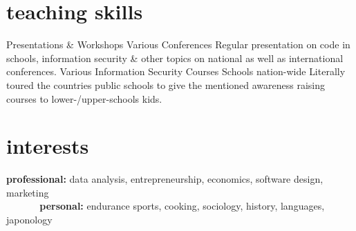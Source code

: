 \documentclass[a4paper]{friggeri-cv} %
\begin{document}

\section{teaching skills}

\begin{entrylist}
{Presentations \& Workshops}
{Various Conferences}
{Regular presentation on code in schools, information security \& other topics on national as well as international conferences.}
{Various Information Security Courses}
{Schools nation-wide}
{Literally toured the countries public schools to give the mentioned awareness raising courses to lower-/upper-schools kids.}
\end{entrylist}


\section{interests}

\textbf{professional:} data analysis, entrepreneurship, economics, software design, marketing \\
\textbf{\ \ \ \ \ \ personal:} endurance sports, cooking, sociology, history, languages, japonology




\end{document}
